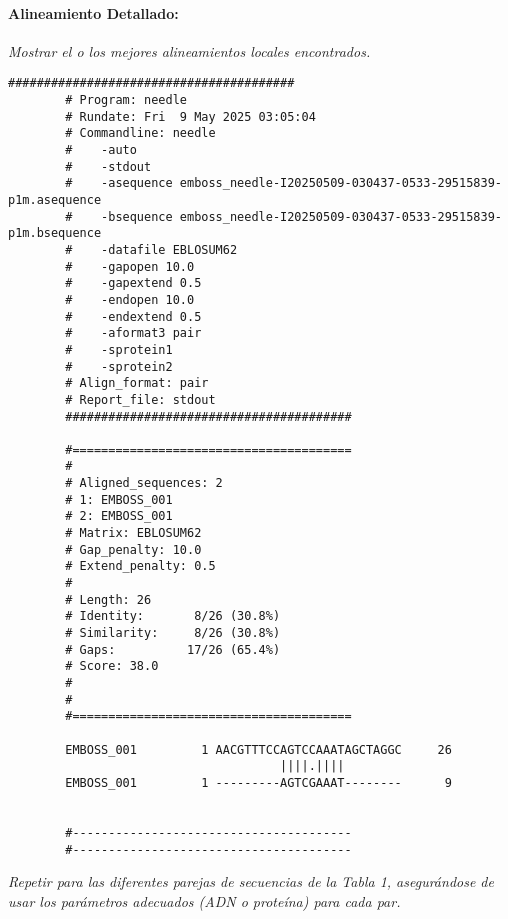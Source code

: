 \documentclass[fleqn,10pt]{article}
\begin{document}
    \paragraph{Alineamiento Detallado:}
    \textit{Mostrar el o los mejores alineamientos locales encontrados.}
    \begin{lstlisting}[style=outputstyle, caption={Alineamiento local por EMBOSS Water (ejemplo)}, basicstyle=\ttfamily\footnotesize]
        ########################################
        # Program: needle
        # Rundate: Fri  9 May 2025 03:05:04
        # Commandline: needle
        #    -auto
        #    -stdout
        #    -asequence emboss_needle-I20250509-030437-0533-29515839-p1m.asequence
        #    -bsequence emboss_needle-I20250509-030437-0533-29515839-p1m.bsequence
        #    -datafile EBLOSUM62
        #    -gapopen 10.0
        #    -gapextend 0.5
        #    -endopen 10.0
        #    -endextend 0.5
        #    -aformat3 pair
        #    -sprotein1
        #    -sprotein2
        # Align_format: pair
        # Report_file: stdout
        ########################################
        
        #=======================================
        #
        # Aligned_sequences: 2
        # 1: EMBOSS_001
        # 2: EMBOSS_001
        # Matrix: EBLOSUM62
        # Gap_penalty: 10.0
        # Extend_penalty: 0.5
        #
        # Length: 26
        # Identity:       8/26 (30.8%)
        # Similarity:     8/26 (30.8%)
        # Gaps:          17/26 (65.4%)
        # Score: 38.0
        # 
        #
        #=======================================
        
        EMBOSS_001         1 AACGTTTCCAGTCCAAATAGCTAGGC     26
                                      ||||.||||        
        EMBOSS_001         1 ---------AGTCGAAAT--------      9
        
        
        #---------------------------------------
        #---------------------------------------
    \end{lstlisting}
\textit{Repetir para las diferentes parejas de secuencias de la Tabla 1, asegurándose de usar los parámetros adecuados (ADN o proteína) para cada par.}
\end{document}
